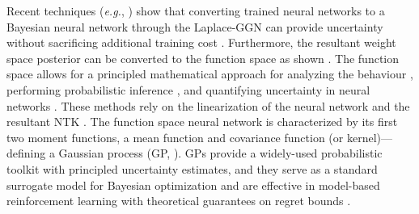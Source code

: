 \documentclass{article}
\makeatletter
\newcommand{\eg}{\textit{e.g.\@}\xspace}
\makeatother
\begin{document}
Recent techniques (\eg, \cite{ritter2018kfac,khan2019approximate,daxberger2021laplace,fortuin2021bayesian,immer2021scalable}) show that converting trained neural networks to a Bayesian neural network through the Laplace-GGN can provide uncertainty without sacrificing additional training cost \cite{foong2019between}. Furthermore, the resultant weight space posterior can be converted to the function space as shown \cite{khan2019approximate, immer2021improving}. The function space allows for a principled mathematical approach for analyzing the behaviour \cite{cho2009kernel,meronen2020stationary}, performing probabilistic inference \cite{khan2019approximate}, and quantifying uncertainty in neural networks \cite{foong2019between}. These methods rely on the linearization of the neural network and the resultant NTK \cite{jacot2018neural}. The function space neural network is characterized by its first two moment functions, a mean function and covariance function (or kernel)---defining a Gaussian process (GP, \cite{rasmussen2006gaussian}). GPs provide a widely-used probabilistic toolkit with principled uncertainty estimates, and they serve as a standard surrogate model for Bayesian optimization \citep{garnett_bayesoptbook_2022} and are effective in model-based reinforcement learning \citep{deisenroth2011pilco} with theoretical guarantees on regret bounds \citep{srinivas2009gaussian}. 
\end{document}
